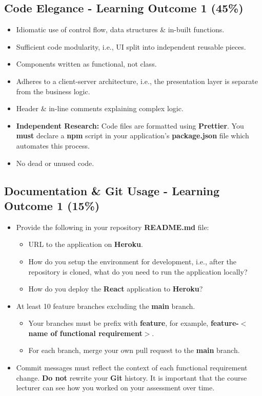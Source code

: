 \documentclass{article}
\begin{document}
\subsection*{Code Elegance - Learning Outcome 1 (45\%)}
\begin{itemize}
    \item Idiomatic use of control flow, data structures \& in-built functions.
    \item Sufficient code modularity, i.e., UI split into independent reusable pieces.
    \item Components written as functional, not class.
    \item Adheres to a client-server architecture, i.e., the presentation layer is separate from the business logic.
    \item Header \& in-line comments explaining complex logic.
    \item \textbf{Independent Research:} Code files are formatted using \textbf{Prettier}. You \textbf{must} declare a \textbf{npm} script in your application's \textbf{package.json} file which automates this process.
    \item No dead or unused code.
\end{itemize}

\subsection*{Documentation \& Git Usage - Learning Outcome 1 (15\%)}
\begin{itemize}
    \item Provide the following in your repository \textbf{README.md} file:
          \begin{itemize}
              \item URL to the application on \textbf{Heroku}.
              \item How do you setup the environment for development, i.e., after the repository is cloned, what do you need to run the application locally?
              \item How do you deploy the \textbf{React} application to \textbf{Heroku}?
          \end{itemize}
            \end{itemize}
        \begin{itemize}
    \item At least 10 feature branches excluding the \textbf{main} branch.
    \begin{itemize}
            \item Your branches must be prefix with \textbf{feature}, for example, \textbf{feature-$<$name of functional requirement$>$}.
            \item For each branch, merge your own pull request to the \textbf{main} branch.
    \end{itemize}
    \item Commit messages must reflect the context of each functional requirement change. \textbf{Do not} rewrite your \textbf{Git} history. It is important that the course lecturer can see how you worked on your assessment over time.
\end{itemize}
\end{document}
